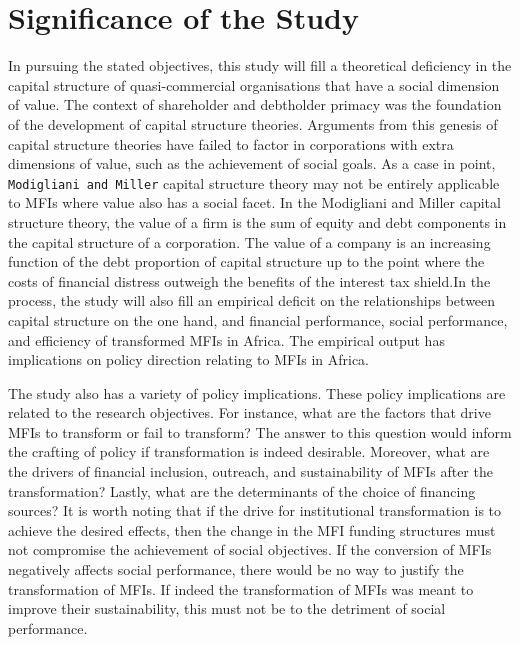 \documentclass[a4paper, nobind]{templates/ociamthesis}
\begin{document}
\hypertarget{significance-of-the-study}{%
\section{Significance of the Study}\label{significance-of-the-study}}

\noindent In pursuing the stated objectives, this study will fill a theoretical deficiency in the capital structure of quasi-commercial organisations that have a social dimension of value. The context of shareholder and debtholder primacy was the foundation of the development of capital structure theories. Arguments from this genesis of capital structure theories have failed to factor in corporations with extra dimensions of value, such as the achievement of social goals. As a case in point, \texttt{Modigliani\ and\ Miller} capital structure theory may not be entirely applicable to MFIs where value also has a social facet. In the Modigliani and Miller capital structure theory, the value of a firm is the sum of equity and debt components in the capital structure of a corporation. The value of a company is an increasing function of the debt proportion of capital structure up to the point where the costs of financial distress outweigh the benefits of the interest tax shield.In the process, the study will also fill an empirical deficit on the relationships between capital structure on the one hand, and financial performance, social performance, and efficiency of transformed MFIs in Africa. The empirical output has implications on policy direction relating to MFIs in Africa.

The study also has a variety of policy implications. These policy implications are related to the research objectives. For instance, what are the factors that drive MFIs to transform or fail to transform? The answer to this question would inform the crafting of policy if transformation is indeed desirable. Moreover, what are the drivers of financial inclusion, outreach, and sustainability of MFIs after the transformation? Lastly, what are the determinants of the choice of financing sources? It is worth noting that if the drive for institutional transformation is to achieve the desired effects, then the change in the MFI funding structures must not compromise the achievement of social objectives. If the conversion of MFIs negatively affects social performance, there would be no way to justify the transformation of MFIs. If indeed the transformation of MFIs was meant to improve their sustainability, this must not be to the detriment of social performance.
\end{document}
